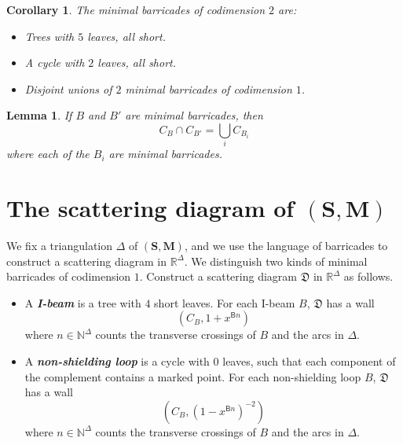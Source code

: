 \documentclass{amsart}
\newtheorem{corollary}[proposition]{Corollary}
\newtheorem{lemma}[proposition]{Lemma}
\newtheorem{conj}[proposition]{Conjecture}
\theoremstyle{definition}
\theoremstyle{remark}
\numberwithin{equation}{section}
\newcommand{\newword}[1]{\textbf{\emph{#1}}}
\newcommand{\0}{{\mathbf{0}}}
\newcommand{\M}{\mathbf{M}}
\renewcommand{\S}{\mathbf{S}}
\begin{document}
\begin{corollary}
The minimal barricades of codimension $2$ are:
\begin{itemize}
	\item Trees with $5$ leaves, all short.
	\item A cycle with $2$ leaves, all short.
	\item Disjoint unions of $2$ minimal barricades of codimension $1$.
\end{itemize}
\end{corollary}

\begin{lemma}
If $B$ and $B'$ are minimal barricades, then 
\[ C_B\cap C_{B'} = \bigcup _i C_{B_i} \]
where each of the $B_i$ are minimal barricades. 
\end{lemma}


\section{The scattering diagram of $(\S,\M)$}

We fix a triangulation $\Delta$ of $(\S,\M)$, and we use the language of barricades to construct a scattering diagram in $\mathbb{R}^\Delta$. We distinguish two kinds of minimal barricades of codimension $1$.
Construct a scattering diagram $\mathfrak{D}$ in $\mathbb{R}^\Delta$ as follows.
\begin{itemize}
	\item A \newword{I-beam} is a tree with $4$ short leaves. For each {I-beam} $B$, $\mathfrak{D}$ has a wall
	\[ (C_B, 1+x^{\mathsf{B}n} )\]
	where $n\in\mathbb{N}^\Delta$ counts the transverse crossings of $B$ and the arcs in $\Delta$.
	\item A \newword{non-shielding loop} is a cycle with $0$ leaves, such that each component of the complement contains a marked point. For each {non-shielding loop} $B$, $\mathfrak{D}$ has a wall
	\[ \left(C_B, (1-x^{\mathsf{B}n})^{-2} \right)\]
	where $n\in\mathbb{N}^\Delta$ counts the transverse crossings of $B$ and the arcs in $\Delta$.
\end{itemize}
\end{document}
